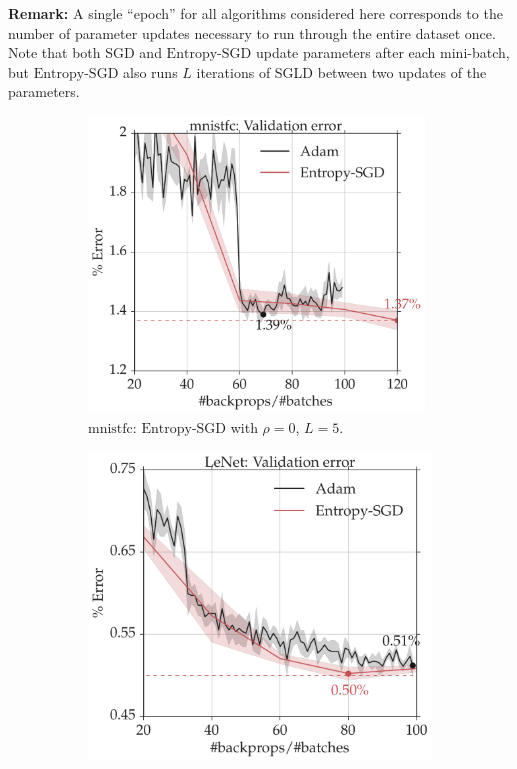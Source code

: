 \documentclass[10pt]{article}
\newcommand{\entropysgd}{\mathrm{Entropy}\textrm{-}\mathrm{SGD}}
\newcommand{\mnistfc}{\textrm{mnistfc}}
\begin{document}
\textbf{Remark:} A single ``epoch'' for all algorithms considered here corresponds to the number of parameter updates necessary to run through the entire dataset once. Note that both SGD and $\entropysgd$ update parameters after each mini-batch, but $\entropysgd$ also runs $L$ iterations of SGLD between two updates of the parameters.

\begin{figure}[h!]
\centering
    \begin{subfigure}[t]{0.45\textwidth}
        \centering
        \includegraphics[width=0.98\textwidth]{mnistfc_valid.pdf}
        \caption{\small $\mnistfc$: $\entropysgd$ with $\rho = 0$, $L = 5$.}
        \label{fig:mnistfc_test}
    \end{subfigure}
    \hspace{0.1in}
    \begin{subfigure}[t]{0.45\textwidth}
        \centering
        \includegraphics[width=\textwidth]{lenet_valid.pdf}

\end{subfigure}
\end{figure}
\end{document}
